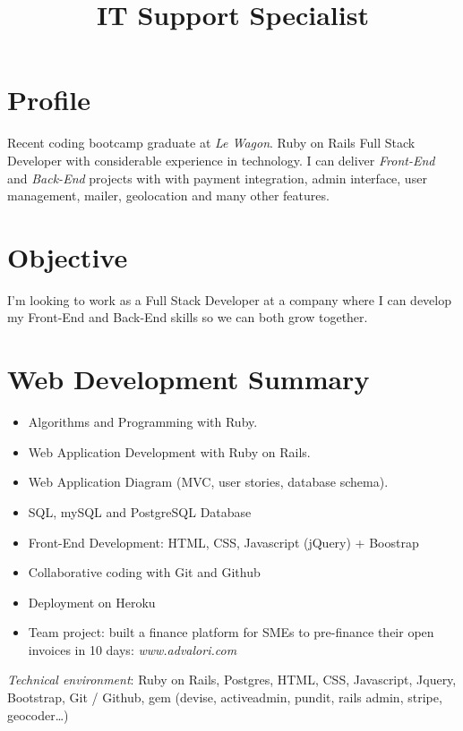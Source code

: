 \documentclass[11pt,a4paper]{moderncv}
\title{IT Support Specialist}
\newcommand{\pl}[1]{\textit{\color{plblue} #1}}
\begin{document}
\maketitle

\section{Profile}
Recent coding bootcamp graduate at \pl{Le Wagon}. Ruby on Rails Full Stack Developer with considerable experience in technology. I can deliver \pl{Front-End} and \pl{Back-End} projects with with payment integration, admin interface, user management, mailer, geolocation and many other features.

\section{Objective}
I'm looking to work as a Full Stack Developer at a company where I can develop my Front-End and Back-End skills so we can both grow together.

\section{Web Development Summary}
\begin{itemize}
\item Algorithms and Programming with Ruby.
\item Web Application Development with Ruby on Rails.
\item Web Application Diagram (MVC, user stories, database schema).
\item SQL, mySQL and PostgreSQL Database
\item Front-End Development: HTML, CSS, Javascript (jQuery) + Boostrap
\item Collaborative coding with Git and Github
\item Deployment on Heroku
\item Team project: built a finance platform for SMEs to pre-finance their open invoices in 10 days: \pl{www.advalori.com}
\end{itemize}

\pl{Technical environment}: Ruby on Rails, Postgres, HTML, CSS, Javascript, Jquery, Bootstrap, Git / Github, gem (devise, activeadmin, pundit, rails admin, stripe, geocoder…)
\end{document}
